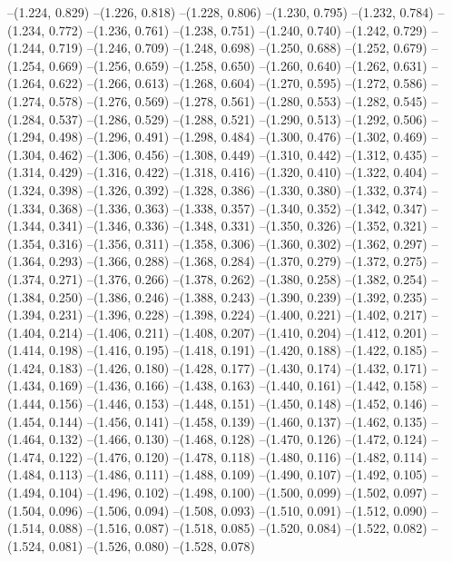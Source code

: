 --(1.224, 0.829)
--(1.226, 0.818)
--(1.228, 0.806)
--(1.230, 0.795)
--(1.232, 0.784)
--(1.234, 0.772)
--(1.236, 0.761)
--(1.238, 0.751)
--(1.240, 0.740)
--(1.242, 0.729)
--(1.244, 0.719)
--(1.246, 0.709)
--(1.248, 0.698)
--(1.250, 0.688)
--(1.252, 0.679)
--(1.254, 0.669)
--(1.256, 0.659)
--(1.258, 0.650)
--(1.260, 0.640)
--(1.262, 0.631)
--(1.264, 0.622)
--(1.266, 0.613)
--(1.268, 0.604)
--(1.270, 0.595)
--(1.272, 0.586)
--(1.274, 0.578)
--(1.276, 0.569)
--(1.278, 0.561)
--(1.280, 0.553)
--(1.282, 0.545)
--(1.284, 0.537)
--(1.286, 0.529)
--(1.288, 0.521)
--(1.290, 0.513)
--(1.292, 0.506)
--(1.294, 0.498)
--(1.296, 0.491)
--(1.298, 0.484)
--(1.300, 0.476)
--(1.302, 0.469)
--(1.304, 0.462)
--(1.306, 0.456)
--(1.308, 0.449)
--(1.310, 0.442)
--(1.312, 0.435)
--(1.314, 0.429)
--(1.316, 0.422)
--(1.318, 0.416)
--(1.320, 0.410)
--(1.322, 0.404)
--(1.324, 0.398)
--(1.326, 0.392)
--(1.328, 0.386)
--(1.330, 0.380)
--(1.332, 0.374)
--(1.334, 0.368)
--(1.336, 0.363)
--(1.338, 0.357)
--(1.340, 0.352)
--(1.342, 0.347)
--(1.344, 0.341)
--(1.346, 0.336)
--(1.348, 0.331)
--(1.350, 0.326)
--(1.352, 0.321)
--(1.354, 0.316)
--(1.356, 0.311)
--(1.358, 0.306)
--(1.360, 0.302)
--(1.362, 0.297)
--(1.364, 0.293)
--(1.366, 0.288)
--(1.368, 0.284)
--(1.370, 0.279)
--(1.372, 0.275)
--(1.374, 0.271)
--(1.376, 0.266)
--(1.378, 0.262)
--(1.380, 0.258)
--(1.382, 0.254)
--(1.384, 0.250)
--(1.386, 0.246)
--(1.388, 0.243)
--(1.390, 0.239)
--(1.392, 0.235)
--(1.394, 0.231)
--(1.396, 0.228)
--(1.398, 0.224)
--(1.400, 0.221)
--(1.402, 0.217)
--(1.404, 0.214)
--(1.406, 0.211)
--(1.408, 0.207)
--(1.410, 0.204)
--(1.412, 0.201)
--(1.414, 0.198)
--(1.416, 0.195)
--(1.418, 0.191)
--(1.420, 0.188)
--(1.422, 0.185)
--(1.424, 0.183)
--(1.426, 0.180)
--(1.428, 0.177)
--(1.430, 0.174)
--(1.432, 0.171)
--(1.434, 0.169)
--(1.436, 0.166)
--(1.438, 0.163)
--(1.440, 0.161)
--(1.442, 0.158)
--(1.444, 0.156)
--(1.446, 0.153)
--(1.448, 0.151)
--(1.450, 0.148)
--(1.452, 0.146)
--(1.454, 0.144)
--(1.456, 0.141)
--(1.458, 0.139)
--(1.460, 0.137)
--(1.462, 0.135)
--(1.464, 0.132)
--(1.466, 0.130)
--(1.468, 0.128)
--(1.470, 0.126)
--(1.472, 0.124)
--(1.474, 0.122)
--(1.476, 0.120)
--(1.478, 0.118)
--(1.480, 0.116)
--(1.482, 0.114)
--(1.484, 0.113)
--(1.486, 0.111)
--(1.488, 0.109)
--(1.490, 0.107)
--(1.492, 0.105)
--(1.494, 0.104)
--(1.496, 0.102)
--(1.498, 0.100)
--(1.500, 0.099)
--(1.502, 0.097)
--(1.504, 0.096)
--(1.506, 0.094)
--(1.508, 0.093)
--(1.510, 0.091)
--(1.512, 0.090)
--(1.514, 0.088)
--(1.516, 0.087)
--(1.518, 0.085)
--(1.520, 0.084)
--(1.522, 0.082)
--(1.524, 0.081)
--(1.526, 0.080)
--(1.528, 0.078)
